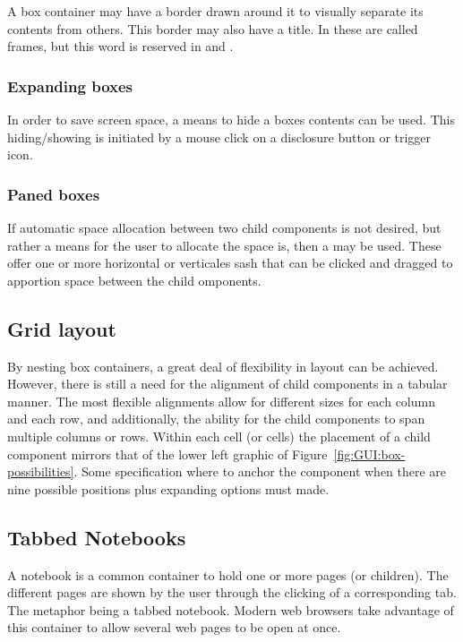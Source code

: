 A box container may have a border drawn around it to visually separate
its contents from others. This border may also have a title. In
\GTK\/ these are called frames, but this word is reserved in \tcltk\/ and
\Java.

\subsubsection{Expanding boxes}
\label{sec:GUI:expanding-boxes}

In order to save screen space, a means to hide a boxes contents can be
used. This hiding/showing is initiated by a mouse click on a
disclosure button or trigger icon.

\subsubsection{Paned boxes}
\label{sec:GUI:paned-boxes}

If automatic space allocation between two child components is not
desired, but rather a means for the user to allocate the space is,
then a  may be used. These offer one or more
horizontal or verticales sash that can be clicked and dragged to
apportion space between the child omponents.

   
\subsection{Grid layout}
\label{sec:GUI:grid-layout}

By nesting box containers, a great deal of flexibility in layout can
be achieved. However, there is still a need for the alignment of child
components in a tabular manner. The most flexible alignments allow for
different sizes for each column and each row, and additionally, the
ability for the child components to span multiple columns or
rows. Within each cell (or cells) the placement of a child component
mirrors that of the lower left graphic of
Figure~\ref{fig:GUI:box-possibilities}. Some specification where to
anchor the component when there are nine possible positions plus
expanding options must made.

\subsection{Tabbed Notebooks}
\label{sec:GUI:notebooks}

A notebook is a common container to hold one or more pages (or
children). The different pages are shown by the user through the
clicking of a corresponding tab. The metaphor being a tabbed
notebook. Modern web browsers take advantage of this container to
allow several web pages to be open at once.




